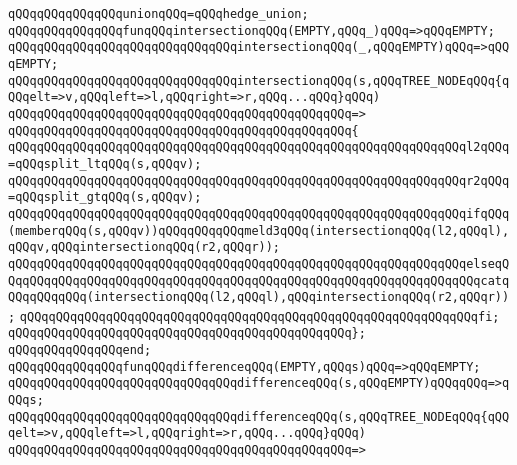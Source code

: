 \verb|qQQqqQQqqQQqqQQqunionqQQq=qQQqhedge_union;|\newline
\newline
\verb|qQQqqQQqqQQqqQQqfunqQQqintersectionqQQq(EMPTY,qQQq_)qQQq=>qQQqEMPTY;|\newline
\verb|qQQqqQQqqQQqqQQqqQQqqQQqqQQqqQQqintersectionqQQq(_,qQQqEMPTY)qQQq=>qQQqEMPTY;|\newline
\newline
\verb|qQQqqQQqqQQqqQQqqQQqqQQqqQQqqQQqintersectionqQQq(s,qQQqTREE_NODEqQQq{qQQqelt=>v,qQQqleft=>l,qQQqright=>r,qQQq...qQQq}qQQq)|\newline
\verb|qQQqqQQqqQQqqQQqqQQqqQQqqQQqqQQqqQQqqQQqqQQqqQQq=>|\newline
\verb|qQQqqQQqqQQqqQQqqQQqqQQqqQQqqQQqqQQqqQQqqQQqqQQq{|\newline
\verb|qQQqqQQqqQQqqQQqqQQqqQQqqQQqqQQqqQQqqQQqqQQqqQQqqQQqqQQqqQQqqQQql2qQQq=qQQqsplit_ltqQQq(s,qQQqv);|\newline
\verb|qQQqqQQqqQQqqQQqqQQqqQQqqQQqqQQqqQQqqQQqqQQqqQQqqQQqqQQqqQQqqQQqr2qQQq=qQQqsplit_gtqQQq(s,qQQqv);|\newline
\newline
\verb|qQQqqQQqqQQqqQQqqQQqqQQqqQQqqQQqqQQqqQQqqQQqqQQqqQQqqQQqqQQqqQQqifqQQq(memberqQQq(s,qQQqv))qQQqqQQqqQQqmeld3qQQq(intersectionqQQq(l2,qQQql),qQQqv,qQQqintersectionqQQq(r2,qQQqr));|\newline
\verb|qQQqqQQqqQQqqQQqqQQqqQQqqQQqqQQqqQQqqQQqqQQqqQQqqQQqqQQqqQQqqQQqelseqQQqqQQqqQQqqQQqqQQqqQQqqQQqqQQqqQQqqQQqqQQqqQQqqQQqqQQqqQQqqQQqqQQqcatqQQqqQQqqQQq(intersectionqQQq(l2,qQQql),qQQqintersectionqQQq(r2,qQQqr));|\newline
\verb|qQQqqQQqqQQqqQQqqQQqqQQqqQQqqQQqqQQqqQQqqQQqqQQqqQQqqQQqqQQqqQQqfi;|\newline
\verb|qQQqqQQqqQQqqQQqqQQqqQQqqQQqqQQqqQQqqQQqqQQqqQQq};|\newline
\verb|qQQqqQQqqQQqqQQqend;|\newline
\newline
\verb|qQQqqQQqqQQqqQQqfunqQQqdifferenceqQQq(EMPTY,qQQqs)qQQq=>qQQqEMPTY;|\newline
\verb|qQQqqQQqqQQqqQQqqQQqqQQqqQQqqQQqdifferenceqQQq(s,qQQqEMPTY)qQQqqQQq=>qQQqs;|\newline
\newline
\verb|qQQqqQQqqQQqqQQqqQQqqQQqqQQqqQQqdifferenceqQQq(s,qQQqTREE_NODEqQQq{qQQqelt=>v,qQQqleft=>l,qQQqright=>r,qQQq...qQQq}qQQq)|\newline
\verb|qQQqqQQqqQQqqQQqqQQqqQQqqQQqqQQqqQQqqQQqqQQqqQQq=>|\newline
